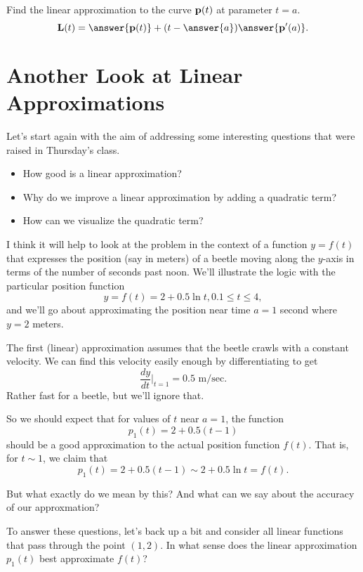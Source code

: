 \documentclass{ximera}
\begin{document}
\begin{question}  \label{Qfdgtyy}
Find the linear approximation to the curve ${\bf p}(t)$ at parameter $t=a$.
\[
     {\bf L} (t) = \answer{{\bf p}(t)} +   (t - \answer{a} )\answer{{\bf p}^\prime(a)}  .
\]
\end{question}




\section{Another Look at Linear Approximations}
Let's start again with the aim of addressing some interesting questions that were raised in Thursday's class.

\begin{itemize}

\item{How good is a linear approximation?}

\item{Why do we improve a linear approximation by adding a quadratic term?}

\item{How can we visualize the quadratic term?}

\end{itemize}

I think it will help to look at the problem in the context of a function $y=f(t)$ that expresses the position (say in meters) of a beetle moving along the $y$-axis in terms of the number of seconds past noon. We'll illustrate the logic with the particular position function
\[
     y = f(t) = 2 + 0.5\ln t, 0.1 \leq t \leq 4 ,
\]
and we'll go about approximating the position near time $a=1$ second where $y=2$ meters.

The first (linear) approximation assumes that the beetle crawls with a constant velocity. We can find this velocity easily enough by differentiating to get
\[
   \frac{dy}{dt} \Big|_{t=1} = 0.5 \text{ m/sec} .
\]
Rather fast for a beetle, but we'll ignore that.

So we should expect that for values of $t$ near $a=1$, the function
\[
    p_1(t) = 2 + 0.5(t-1)
\]
should be a good approximation to the actual position function $f(t)$. That is, for $t\sim 1$, we claim that
\[
       p_1(t) = 2 + 0.5(t-1) \sim 2 + 0.5 \ln t = f(t).
\]

But what exactly do we mean by this? And what can we say about the accuracy of our approxmation?

To answer these questions, let's back up a bit and consider all linear functions that pass through the point $(1,2)$. In what sense does the linear approximation $p_1(t)$ best approximate $f(t)$?
\end{document}
